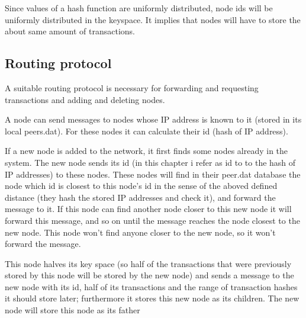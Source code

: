 \documentclass[a4paper,12pt]{article}
\begin{document}
Since values of a hash function are uniformly distributed, node ids will be uniformly distributed in the keyspace. It implies that nodes will have to store the about same amount of transactions.






\subsection{Routing protocol}

A suitable routing protocol is necessary for forwarding and requesting transactions and adding and deleting nodes.

A node can send messages to nodes whose IP address is known to it (stored in its local peers.dat). For these nodes it can calculate their id (hash of IP address).

If a new node is added to the network,  it first finds some nodes already in the system.
The new node sends its id  (in this chapter i refer as id to to the hash of IP addresses) to these nodes. These nodes will find in their peer.dat database the node which id is closest to this node's id in the sense of the aboved defined distance (they hash the stored IP addresses and check it), and forward the message to it. If this node can find another node closer to this new node it will forward this message, and so on until the message reaches the node closest to the new node. This node won't find anyone closer to the new node, so it won't forward the message.

This node halves its key space (so half of the transactions that were previously stored by this node will be stored by the new node) and sends a message to the new node with its id, half of its transactions and the range of transaction hashes it should store later; furthermore it stores this new node as its children. The new node will store this node as its father
\end{document}
